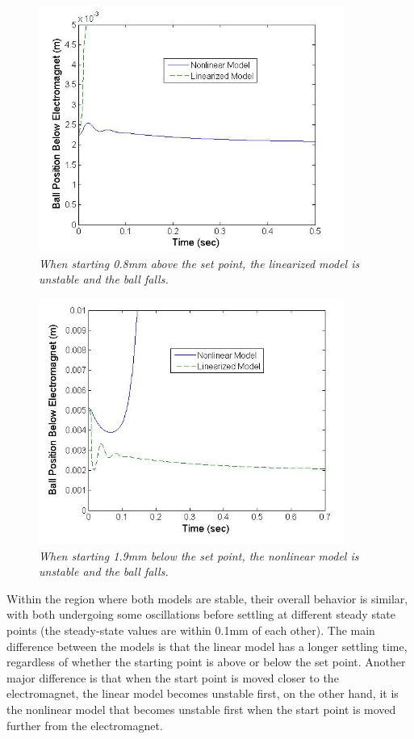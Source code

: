 \documentclass{article}
\theoremstyle{plain}
\theoremstyle{definition}
\theoremstyle{remark}
\begin{document}
\begin{figure}[h!]
\begin{center}
\includegraphics[width = 10cm]{Part2bCloseDisturbance.jpg}
\caption{\emph{When starting 0.8mm above the set point, the linearized model is unstable and the ball falls.}}
\label{Q2_b5}
\end{center}
\end{figure}

\begin{figure}[h!]
\begin{center}
\includegraphics[width = 10cm]{Part2bFarDisturbance.jpg}
\caption{\emph{When starting 1.9mm below the set point, the nonlinear model is unstable and the ball falls.}}
\label{Q2_b6}
\end{center}
\end{figure}

Within the region where both models are stable, their overall behavior is similar, with both undergoing some oscillations before settling at different steady state points (the steady-state values are within 0.1mm of each other). The main difference between the models is that the linear model has a longer settling time, regardless of whether the starting point is above or below the set point. Another major difference is that when the start point is moved closer to the electromagnet, the linear model becomes unstable first, on the other hand, it is the nonlinear model that becomes unstable first when the start point is moved further from the electromagnet. 
\end{document}
